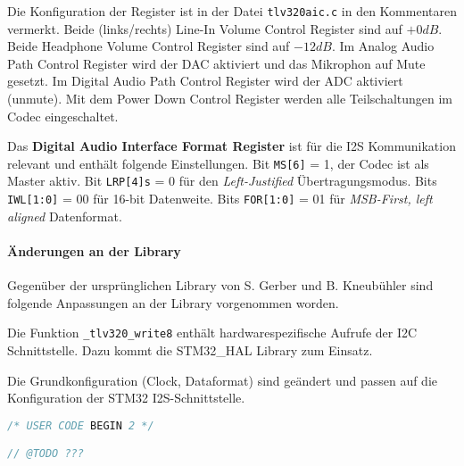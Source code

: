 Die Konfiguration der Register ist in der Datei \texttt{tlv320aic.c} in den Kommentaren vermerkt. Beide (links/rechts) Line-In Volume Control Register sind auf $+0\si{dB}$.
Beide Headphone Volume Control Register sind auf $-12\si{dB}$.
Im Analog Audio Path Control Register wird der DAC aktiviert und das Mikrophon auf Mute gesetzt.
Im Digital Audio Path Control Register wird der ADC aktiviert (unmute).
Mit dem Power Down Control Register werden alle Teilschaltungen im Codec eingeschaltet.

Das \textbf{Digital Audio Interface Format Register} ist für die I2S Kommunikation relevant und enthält folgende Einstellungen. Bit \texttt{MS[6]} = 1, der Codec ist als Master aktiv. Bit \texttt{LRP[4]s} = 0 für den \textit{Left-Justified} Übertragungsmodus.
Bits \texttt{IWL[1:0]} = 00 für 16-bit Datenweite.
Bits \texttt{FOR[1:0]} = 01 für \textit{MSB-First, left aligned} Datenformat.

\paragraph{Änderungen an der Library}

Gegenüber der ursprünglichen Library von S. Gerber und B. Kneubühler sind folgende Anpassungen an der Library vorgenommen worden.

Die Funktion \texttt{\_tlv320\_write8} enthält hardwarespezifische Aufrufe der I2C Schnittstelle. Dazu kommt die STM32\_HAL Library zum Einsatz.

Die Grundkonfiguration (Clock, Dataformat) sind geändert und passen auf die Konfiguration der STM32 I2S-Schnittstelle.


\begin{lstlisting}[language=c]
/* USER CODE BEGIN 2 */

// @TODO ???

\end{lstlisting}

